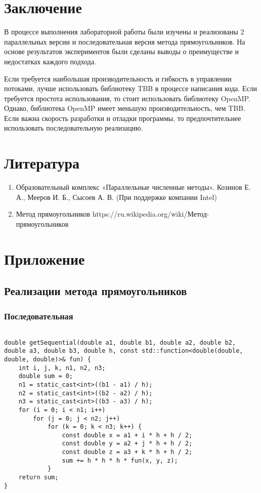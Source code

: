 \documentclass[14pt, a4paper]{extarticle}
\begin{document}
  \newpage

  \section{Заключение}
В процессе выполнения лабораторной работы были изучены и реализованы 2 параллельных версии и последовательная версия метода прямоугольников. На основе результатов экспериментов были сделаны выводы о преимуществе и недостатках каждого подхода.

Если требуется наибольшая производительность и гибкость в управлении потоками, лучше использовать библиотеку TBB в процессе написания кода. Если требуется простота использования, то стоит использовать библиотеку OpenMP. Однако, библиотека OpenMP имеет меньшую производительность, чем TBB. Если важна скорость разработки и отладки программы, то предпочтительнее использовать последовательную реализацию.
 
  \newpage

    \section{Литература}
    
    \begin{enumerate}
        \item Образовательный комплекс «Параллельные численные методы». Козинов Е. А., Мееров И. Б., Сысоев А. В. (При поддержке компании Intel)
        \item  Метод прямоугольников https://ru.wikipedia.org/wiki/Метод-прямоугольников 
    \end{enumerate}

  \newpage

  \section{Приложение}

  \subsection{Реализации метода прямоугольников}
    \subsubsection{Последовательная}
  \begin{lstlisting}

double getSequential(double a1, double b1, double a2, double b2, double a3, double b3, double h, const std::function<double(double, double, double)>& fun) {
    int i, j, k, n1, n2, n3;
    double sum = 0;
    n1 = static_cast<int>((b1 - a1) / h);
    n2 = static_cast<int>((b2 - a2) / h);
    n3 = static_cast<int>((b3 - a3) / h);
    for (i = 0; i < n1; i++)
        for (j = 0; j < n2; j++)
            for (k = 0; k < n3; k++) {
                const double x = a1 + i * h + h / 2;
                const double y = a2 + j * h + h / 2;
                const double z = a3 + k * h + h / 2;
                sum += h * h * h * fun(x, y, z);
            }
    return sum;
}

  \end{lstlisting}
  \newpage
\end{document}

